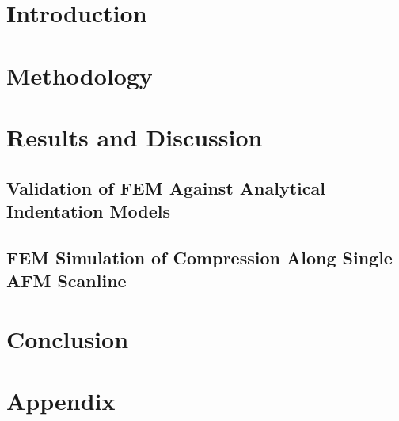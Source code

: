 




\section{Introduction}


\section{Methodology}



\section{Results and Discussion}
\subsection{Validation of FEM Against Analytical Indentation Models}

\subsection{FEM Simulation of Compression Along Single AFM Scanline }


% 

\section{Conclusion}






\section*{Appendix}
\appendix



